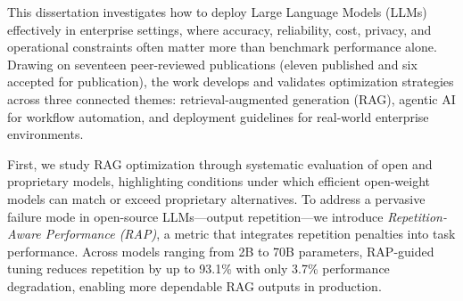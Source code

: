\begin{singlespace}


This dissertation investigates how to deploy Large Language Models (LLMs) effectively in enterprise settings, where accuracy, reliability, cost, privacy, and operational constraints often matter more than benchmark performance alone. Drawing on seventeen peer-reviewed publications (eleven published and six accepted for publication), the work develops and validates optimization strategies across three connected themes: retrieval-augmented generation (RAG), agentic AI for workflow automation, and deployment guidelines for real-world enterprise environments.

First, we study RAG optimization through systematic evaluation of open and proprietary models, highlighting conditions under which efficient open-weight models can match or exceed proprietary alternatives. To address a pervasive failure mode in open-source LLMs---output repetition---we introduce \emph{Repetition-Aware Performance (RAP)}, a metric that integrates repetition penalties into task performance. Across models ranging from 2B to 70B parameters, RAP-guided tuning reduces repetition by up to 93.1\% with only 3.7\% performance degradation, enabling more dependable RAG outputs in production.


\end{singlespace}
